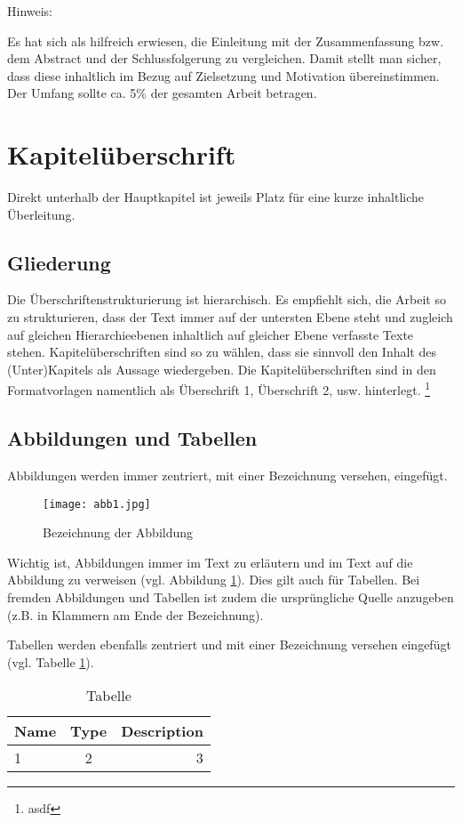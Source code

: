 \documentclass[12pt, oneside]{article}
\begin{document}
Hinweis:

Es hat sich als hilfreich erwiesen, die Einleitung mit der Zusammenfassung bzw. dem Abstract und der Schlussfolgerung zu vergleichen. Damit stellt man sicher, dass diese inhaltlich im Bezug auf Zielsetzung und Motivation übereinstimmen. Der Umfang sollte ca. 5\% der gesamten Arbeit betragen.

\newpage

\section{Kapitelüberschrift} \label{Kapitelüberschrift}
Direkt unterhalb der Hauptkapitel ist jeweils Platz für eine kurze inhaltliche Überleitung.  

\subsection{Gliederung}
Die Überschriftenstrukturierung ist hierarchisch. Es empfiehlt sich, die Arbeit so zu strukturieren, dass der Text immer auf der untersten Ebene steht und zugleich auf gleichen Hierarchieebenen inhaltlich auf gleicher Ebene verfasste Texte stehen. Kapitelüberschriften sind so zu wählen, dass sie sinnvoll den Inhalt des (Unter)Kapitels als Aussage wiedergeben. Die Kapitelüberschriften sind in den Formatvorlagen namentlich als Überschrift 1, Überschrift 2, usw. hinterlegt. \footnote{asdf}

\subsection{Abbildungen und Tabellen}
Abbildungen werden immer zentriert, mit einer Bezeichnung versehen, eingefügt. 
\begin{figure}[!h]
    \centering
    \texttt{[image: abb1.jpg]}
    \caption{Bezeichnung der Abbildung}
    \label{fig:beispielbild}
\end{figure}
\bigskip
\newline
Wichtig ist, Abbildungen immer im Text zu erläutern und im Text auf die Abbildung zu verweisen (vgl. Abbildung \ref{fig:beispielbild}). Dies gilt auch für Tabellen. Bei fremden Abbildungen und Tabellen ist zudem die ursprüngliche Quelle anzugeben (z.B. in Klammern am Ende der Bezeichnung).

Tabellen werden ebenfalls zentriert und mit einer Bezeichnung versehen eingefügt (vgl. Tabelle \ref{Tab1}).

\begin{table}[H]
\centering
\caption{Tabelle}
\label{Tab1}
\def\arraystretch{1.2}%
\begin{tabular}{ | l | c | r | }
 \hline	
 Name & Type & Description \\ 
  \hline			
  1 & 2 & 3 \\
  \hline  
\end{tabular}
\end{table}
\end{document}
